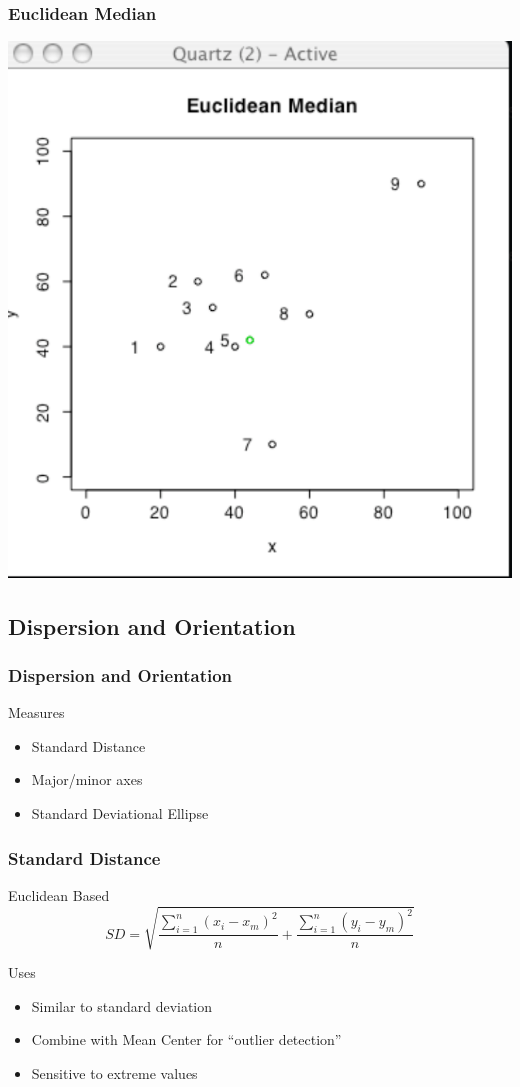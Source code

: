 \documentclass[nototal]{beamer}
\begin{document}
\begin{frame}
   \frametitle{Euclidean Median}
   \begin{center}
     \includegraphics[width=.65\linewidth]{euclideancenter}
   \end{center}
 \end{frame}



\subsection{Dispersion and Orientation}
\begin{frame}
  \frametitle{Dispersion and Orientation}
  \begin{block}{Measures}
    \begin{itemize}
      \item Standard Distance
      \item Major/minor axes
      \item Standard Deviational Ellipse
    \end{itemize}
   \end{block}
 \end{frame}

 \begin{frame}
   \frametitle{Standard Distance}
   \begin{block}{Euclidean Based}
     \begin{equation}
       SD = \sqrt{\frac{\sum_{i=1}^n (x_i-x_m)^2}{n} +\frac{\sum_{i=1}^n (y_i-y_m)^2}{n} }
     \end{equation}
    \end{block}
    \begin{block}{Uses}
      \begin{itemize}
	\item Similar to standard deviation
	\item Combine with Mean Center for ``outlier detection''
	\item Sensitive to extreme values
      \end{itemize}

     \end{block}
  \end{frame}
\end{document}
